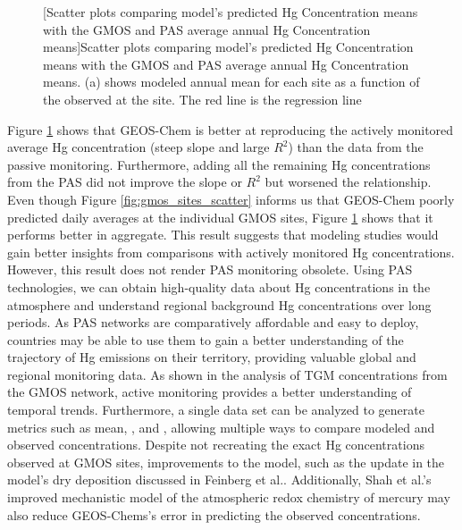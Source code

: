 \begin{flushleft}
\begin{figure}[H]
[Scatter plots comparing model's predicted Hg Concentration means with the GMOS and PAS average annual Hg Concentration means]{Scatter plots comparing model's predicted Hg Concentration means with the GMOS and PAS average annual Hg Concentration means. (a) shows modeled annual mean \hgc for each site as a function of the observed \hgc at the site. The red line is the regression line}
\label{fig:pas_vs_gmos}
\end{figure}
\FloatBarrier
Figure \ref{fig:pas_vs_gmos} shows that GEOS-Chem is better at reproducing  the actively monitored average Hg concentration (steep slope and large $R^2$) than the data from the passive monitoring. Furthermore, adding all the remaining Hg concentrations from the PAS did not improve the slope or $R^2$ but worsened the relationship. Even though Figure \ref{fig:gmos_sites_scatter} informs us that GEOS-Chem poorly predicted daily averages at the individual GMOS sites, Figure \ref{fig:pas_vs_gmos} shows that it performs better in aggregate. This result suggests that modeling studies would gain better insights from comparisons with actively monitored Hg concentrations. However, this result does not render PAS monitoring obsolete. Using PAS technologies, we can obtain high-quality data about Hg concentrations in the atmosphere and understand regional background Hg concentrations over long periods. As PAS networks are comparatively affordable and easy to deploy, countries may be able to use them to gain a better understanding of the trajectory of Hg emissions on their territory, providing valuable global and regional monitoring data. As shown in the analysis of TGM concentrations from the GMOS network, active monitoring provides a better understanding of temporal trends.
Furthermore, a single data set can be analyzed to generate metrics such as mean, \iq, and \nft, allowing multiple ways to compare modeled and observed concentrations. Despite  not recreating the exact Hg concentrations  observed at GMOS sites, improvements to the model, such as the update in the model's dry deposition discussed in Feinberg et al.\cite{feinberg_evaluating_2022}. Additionally, Shah et al.'s\cite{shah_improved_2021} improved mechanistic model of the atmospheric redox chemistry of mercury may also reduce  GEOS-Chems's error in predicting the observed concentrations.
\end{flushleft}

